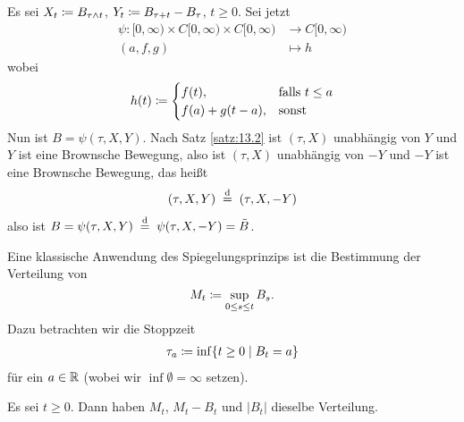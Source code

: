 \documentclass[a4paper,twoside,DIV15,BCOR12mm]{scrbook}
\begin{document}
\begin{center}
\end{center}

\begin{beweis}
Es sei $X_t \da B_{\tau\wedge t}$, $Y_t\da B_{\tau+t}-B_\tau$, $t\ge 0$. Sei jetzt 
\begin{align*}
\psi: [0,\infty) \times C[0,\infty) \times C[0,\infty) &\to C[0,\infty) \\
(a, f , g) &\mapsto h
\end{align*}
wobei
\begin{align*}
h(t) \da 
\begin{cases}
f(t), &\text{falls } t\le a \\
f(a) + g(t-a), &\text{sonst}
\end{cases}
\end{align*}
Nun ist $B= \psi(\tau, X, Y)$. Nach Satz \ref{satz:13.2} ist $(\tau,X)$ unabhängig von $Y$ und $Y$ ist eine Brownsche Bewegung, also ist $(\tau, X)$ unabhängig von $-Y$ und $-Y$ ist eine Brownsche Bewegung, das heißt
\begin{align*}
(\tau,X,Y) \gleichnach{d} (\tau,X,-Y)
\end{align*}
also ist $B=\psi(\tau,X,Y) \gleichnach{d} \psi(\tau,X,-Y)=\tilde B$.
\end{beweis}

Eine klassische Anwendung des Spiegelungsprinzips ist die Bestimmung der Verteilung von 
\[
M_t \da \sup_{0\le s\le t}B_s.
\]
Dazu betrachten wir die Stoppzeit 
\begin{align*}
\tau_a \da \inf\{t\ge 0\mid B_t=a\}
\end{align*}
für ein $a\in \mathbb{R}$ (wobei wir $\inf\emptyset = \infty$ setzen).

\begin{satz}
Es sei $t\ge 0$. Dann haben $M_t$, $M_t-B_t$ und $|B_t|$ dieselbe Verteilung.
\end{satz}
\end{document}
